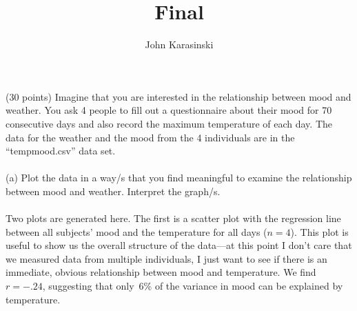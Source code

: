 \documentclass[onecolumn,10pt]{jhwhw}
\author{John Karasinski}
\title{Final}
\begin{document}

\problem{}
(30 points) Imagine that you are interested in the relationship between mood and weather. You ask 4 people to fill out a questionnaire about their mood for 70 consecutive days and also record the maximum temperature of each day. The data for the weather and the mood from the 4 individuals are in the “tempmood.csv” data set.\\
\\
(a) Plot the data in a way/s that you find meaningful to examine the relationship between mood and weather. Interpret the graph/s.\\
\\
Two plots are generated here. The first is a scatter plot with the regression line between all subjects' mood and the temperature for all days ($n=4$). This plot is useful to show us the overall structure of the data---at this point I don't care that we measured data from multiple individuals, I just want to see if there is an immediate, obvious relationship between mood and temperature. We find $r=-.24$, suggesting that only~6\% of the variance in mood can be explained by temperature.
\end{document}
